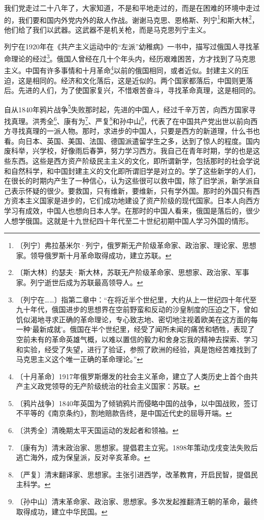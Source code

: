 \documentclass[12pt,UTF-8,openany]{ctexbook}
\begin{document}
\begin{normalsize}
    
    我们党走过二十八年了，大家知道，不是和平地走过的，而是在困难的环境中走过的，我们要和国内外党内外的敌人作战。谢谢马克思、恩格斯、列宁\footnote{〔列宁〕弗拉基米尔·列宁，俄罗斯无产阶级革命家、政治家、理论家、思想家。领导俄罗斯十月革命取得成功，建立苏联。}和斯大林\footnote{〔斯大林〕约瑟夫·斯大林，苏联无产阶级革命家、思想家、政治家、军事家。列宁逝世后成为苏联最高领导人。}，他们给了我们以武器。这武器不是机关枪，而是马克思列宁主义。
    
    列宁在1920年在《共产主义运动中的“左派”幼稚病》一书中，描写过俄国人寻找革命理论的经过\footnote{〔列宁在……〕指第二章中：“在将近半个世纪里，大约从上一世纪四十年代至九十年代，俄国进步的思想界在空前野蛮和反动的沙皇制度的压迫之下，曾如饥似渴地寻求正确的革命理论，专心致志地、密切地注视着欧美在这方面的每一种‘最新成就’。俄国在半个世纪里，经受了闻所未闻的痛苦和牺牲，表现了空前未有的革命英雄气概，以难以置信的毅力和舍身忘我的精神去探索、学习和实验，经受了失望，进行了验证，参照了欧洲的经验，真是饱经苦难找到了马克思主义这个唯一正确的革命理论。”}。俄国人曾经在几十个年头内，经历艰难困苦，方才找到了马克思主义。中国有许多事情和十月革命\footnote{〔十月革命〕1917年俄罗斯爆发的社会主义革命，建立了人类历史上首个由共产主义政党领导的无产阶级统治的社会主义国家：苏联。}以前的俄国相同，或者近似。封建主义的压迫，这是相同的。经济和文化落后，这是近似的。两个国家都落后，中国则更落后。先进的人们，为了使国家复兴，不惜艰苦奋斗，寻找革命真理，这是相同的。
    
    自从1840年鸦片战争\footnote{〔鸦片战争〕1840年英国为了倾销鸦片而侵略中国的战争，以中国战败，签订不平等的《南京条约》，割地赔款告终，是中国近代史的屈辱开端。}失败那时起，先进的中国人，经过千辛万苦，向西方国家寻找真理。洪秀全\footnote{〔洪秀全〕清晚期太平天国运动的发起者和领袖。}、康有为\footnote{〔康有为〕清末政治家、思想家。提倡君主立宪。1898年策动戊戌变法失败后逃亡海外，成为保皇派，反对辛亥革命。}、严复\footnote{〔严复〕清末翻译家、思想家。主张引进西学，改革教育，开启民智，提倡民主科学。}和孙中山\footnote{〔孙中山〕清末革命家、政治家、思想家。多次发起推翻清王朝的革命，最终取得成功，建立中华民国。}，代表了在中国共产党出世以前向西方寻找真理的一派人物。那时，求进步的中国人，只要是西方的新道理，什么书也看。向日本、英国、美国、法国、德国派遣留学生之多，达到了惊人的程度。国内废科举，兴学校，好像雨后春笋，努力学习西方。我自己在青年时期，学的也是这些东西。这些是西方资产阶级民主主义的文化，即所谓新学，包括那时的社会学说和自然科学，和中国封建主义的文化即所谓旧学是对立的。学了这些新学的人们，在很长的时期内产生了一种信心，认为这些很可以救中国，除了旧学派，新学派自己表示怀疑的很少。要救国，只有维新，要维新，只有学外国。那时的外国只有西方资本主义国家是进步的，它们成功地建设了资产阶级的现代国家。日本人向西方学习有成效，中国人也想向日本人学。在那时的中国人看来，俄国是落后的，很少人想学俄国。这就是十九世纪四十年代至二十世纪初期中国人学习外国的情形。
    

\end{normalsize}
\end{document}
